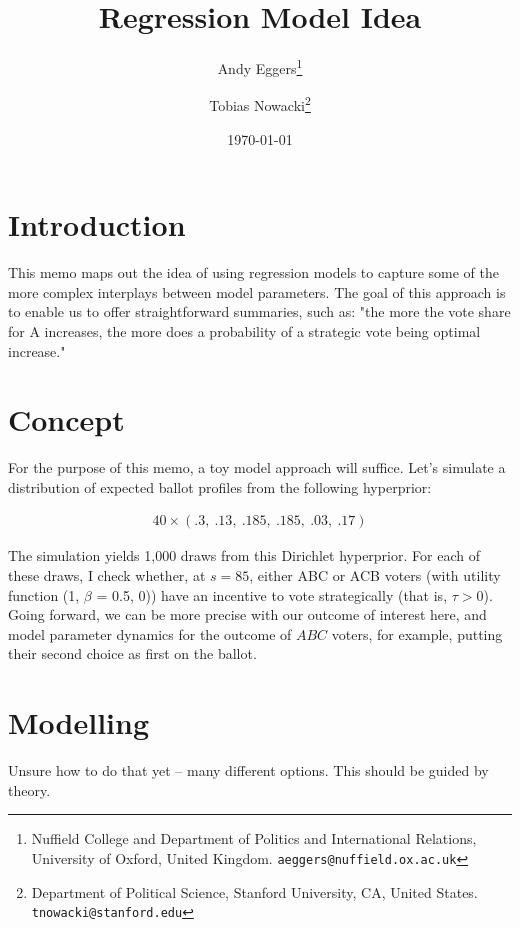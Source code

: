 \documentclass[11pt, letter, margin = 2 in]{article}
\begin{document}
\author{Andy Eggers\thanks{Nuffield College and Department of Politics and International Relations, University of Oxford, United Kingdom. \texttt{aeggers@nuffield.ox.ac.uk}}
\and
Tobias Nowacki\thanks{Department of Political Science, Stanford University, CA, United States. \texttt{tnowacki@stanford.edu}}}
\date{\today}
\title{Regression Model Idea}

\maketitle

\section{Introduction}

This memo maps out the idea of using regression models to capture some of the more complex interplays between model parameters. The goal of this approach is to enable us to offer straightforward summaries, such as: "the more the vote share for A increases, the more does a probability of a strategic vote being optimal increase."

\section{Concept}

For the purpose of this memo, a toy model approach will suffice. Let's simulate a distribution of expected ballot profiles from the following hyperprior:

\begin{align}
40 \times (.3, \ .13, \ .185, \ .185, \ .03, \ .17)
\end{align}

The simulation yields 1,000 draws from this Dirichlet hyperprior. For each of these draws, I check whether, at $s = 85$, either ABC or ACB voters (with utility function (1, $\beta$ = 0.5, 0)) have an incentive to vote strategically (that is, $\tau > 0$). Going forward, we can be more precise with our outcome of interest here, and model parameter dynamics for the outcome of $ABC$ voters, for example, putting their second choice as first on the ballot. 

\section{Modelling}

Unsure how to do that yet -- many different options. This should be guided by theory.
\end{document}
